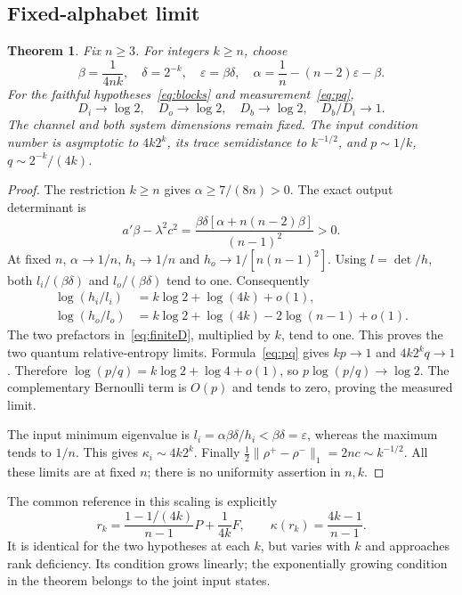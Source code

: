 \documentclass[11pt]{article}
\newtheorem{theorem}{Theorem}[section]
\theoremstyle{remark}\newtheorem{remark}[theorem]{Remark}
\newcommand{\eps}{\varepsilon}
\begin{document}
\subsection{Fixed-alphabet limit}
\begin{theorem}\label{thm:fixed}
Fix $n\geq3$. For integers $k\geq n$, choose
\begin{equation}\label{eq:scaling}
 \beta=\frac1{4nk},\quad\delta=2^{-k},\quad
 \eps=\beta\delta,\quad\alpha=\frac1n-(n-2)\eps-\beta.
\end{equation}
For the faithful hypotheses~\eqref{eq:blocks} and measurement~\eqref{eq:pq},
\[
 D_i\longrightarrow\log2,\quad D_o\longrightarrow\log2,\quad
 D_b\longrightarrow\log2,\quad D_b/D_i\longrightarrow1.
\]
The channel and both system dimensions remain fixed. The input condition number is asymptotic to $4k2^k$, its trace semidistance to $k^{-1/2}$, and $p\sim1/k$, $q\sim2^{-k}/(4k)$.
\end{theorem}
\begin{proof}
The restriction $k\geq n$ gives $\alpha\geq7/(8n)>0$. The exact output determinant is
\[
 a'\beta-\lambda^2c^2=
 \frac{\beta\delta[\alpha+n(n-2)\beta]}{(n-1)^2}>0.
\]
At fixed $n$, $\alpha\to1/n$, $h_i\to1/n$ and $h_o\to1/[n(n-1)^2]$. Using $l=\det/h$, both $l_i/(\beta\delta)$ and $l_o/(\beta\delta)$ tend to one. Consequently
\begin{align*}
 \log(h_i/l_i)&=k\log2+\log(4k)+o(1),\\
 \log(h_o/l_o)&=k\log2+\log(4k)-2\log(n-1)+o(1).
\end{align*}
The two prefactors in~\eqref{eq:finiteD}, multiplied by $k$, tend to one. This proves the two quantum relative-entropy limits. Formula~\eqref{eq:pq} gives $kp\to1$ and $4k2^kq\to1$. Therefore $\log(p/q)=k\log2+\log4+o(1)$, so $p\log(p/q)\to\log2$. The complementary Bernoulli term is $O(p)$ and tends to zero, proving the measured limit.

The input minimum eigenvalue is $l_i=\alpha\beta\delta/h_i<\beta\delta=\eps$, whereas the maximum tends to $1/n$. This gives $\kappa_i\sim4k2^k$. Finally $\tfrac12\|\rho^+-\rho^-\|_1=2nc\sim k^{-1/2}$. All these limits are at fixed $n$; there is no uniformity assertion in $n,k$.
\end{proof}

The common reference in this scaling is explicitly
\[
 r_k=\frac{1-1/(4k)}{n-1}P+\frac1{4k}F,
 \qquad \kappa(r_k)=\frac{4k-1}{n-1}.
\]
It is identical for the two hypotheses at each $k$, but varies with $k$ and approaches rank deficiency. Its condition grows linearly; the exponentially growing condition in the theorem belongs to the joint input states.
\end{document}
